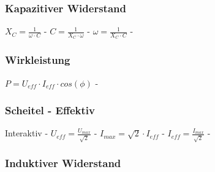 \subsubsection{Kapazitiver Widerstand} 
\begin{minipage}{0.45\textwidth} 
\end{minipage} 
\begin{minipage}{0.45\textwidth} 
 
\legende{}\end{minipage} 
 
$ X_{C} = \frac{ 1}{\omega \cdot C} $ - $ C = \frac{ 1}{X_{C} \cdot \omega } $ - $ \omega = \frac{ 1}{X_{C} \cdot C} $ - \\ 
 
\subsubsection{Wirkleistung} 
\begin{minipage}{0.45\textwidth} 
\end{minipage} 
\begin{minipage}{0.45\textwidth} 
 
\legende{}\end{minipage} 
 
$ P = U_{eff}\cdot I_{eff}\cdot cos(\phi ) $ - \\ 
 
\subsubsection{Scheitel - Effektiv} 
\begin{minipage}{0.45\textwidth} 
\end{minipage} 
\begin{minipage}{0.45\textwidth} 
 
\legende{}\end{minipage} 
 
Interaktiv - $ U_{eff}  = \frac{U_{max} }{\sqrt{2}} $ - $ I_{max}  = \sqrt{2}\cdot I_{eff} $ - $ I_{eff}  = \frac{I_{max} }{\sqrt{2}} $ - \\ 
 
\subsubsection{Induktiver Widerstand} 
\begin{minipage}{0.45\textwidth} 
\end{minipage} 
\begin{minipage}{0.45\textwidth} 
 
\legende{}\end{minipage} 
 
